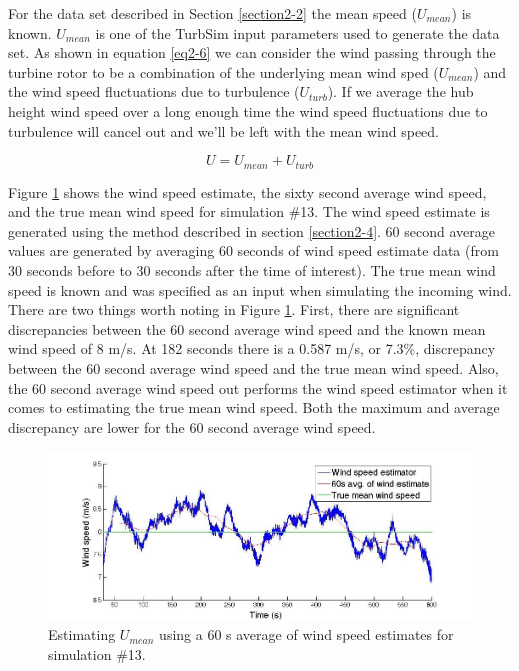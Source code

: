 For the data set described in Section \ref{section2-2} the mean speed ($U_{mean}$) is known. $U_{mean}$ is one of the TurbSim input parameters used to generate the data set. As shown in equation \ref{eq2-6} we can consider the wind passing through the turbine rotor to be a combination of the underlying mean wind sped ($U_{mean}$) and the wind speed fluctuations due to turbulence ($U_{turb}$). If we average the hub height wind speed over a long enough time the wind speed fluctuations due to turbulence will cancel out and we'll be left with the mean wind speed. 


\begin{equation}
	 U =  U_{mean} +U_{turb}  \label{eq2-6}
\end{equation}

Figure \ref{fig2-25} shows the wind speed estimate, the sixty second average wind speed, and the true mean wind speed for simulation \#13. The wind speed estimate is generated using the method described in section \ref{section2-4}. 60 second average values are generated by averaging 60 seconds of wind speed estimate data (from 30 seconds before to 30 seconds after the time of interest). The true mean wind speed is known and was specified as an input when simulating the incoming wind. There are two things worth noting in Figure \ref{fig2-25}. First, there are significant discrepancies between the 60 second average wind speed and the known mean wind speed of 8 m/s. At 182 seconds there is a 0.587 m/s, or 7.3\%,  discrepancy between the 60 second average wind speed and the true mean wind speed. Also, the 60 second average wind speed out performs the wind speed estimator when it comes to estimating the true mean wind speed. Both the maximum and average discrepancy are lower for the 60 second average wind speed. 

\begin{figure}[htbp]
	\centering
		\includegraphics[width = \linewidth]{Figures/ch2Figures/fig2-25.jpg}
		
	\caption{Estimating $U_{mean}$ using a 60 s average of wind speed estimates for simulation \#13.}
	\label{fig2-25}
\end{figure}

